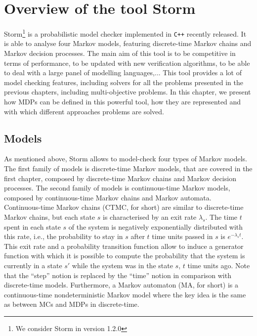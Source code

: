 \chapter{Overview of the tool Storm}\label{storm-chapter}

Storm\footnote{We consider Storm in version  1.2.0} \cite{storm1} is a probabilistic model checker implemented in \verb|C++| recently released. It is able to analyse
four Markov models, featuring discrete-time Markov chains and Markov decision processes. The main aim of this tool is to be competitive in terms of performance, to be updated with new verification algorithms, to be able to
deal with a large panel of modelling languages,... This tool provides %
a lot of model checking features, including solvers for all the problems presented in the previous chapters, including multi-objective problems.
In this chapter, we present how MDPs can be defined in this powerful tool, how they are represented and with which different approaches problems are solved.

\section{Models}
As mentioned above, Storm allows to model-check four types of Markov models.
The first family of models is discrete-time Markov models, that are covered in the first chapter, composed by
discrete-time Markov chains and Markov decision processes.
The second family of models is continuous-time Markov models, composed by continuous-time Markov chains and Markov automata. \\

Continuous-time Markov chains (CTMC, for short) \cite{maro} are similar to discrete-time Markov chains, but each state $s$ is
characterised by an exit rate $\lambda_s$.
The time $t$ spent in each state $s$ of the system is negatively exponentially distributed with this rate, i.e., the probability to stay in $s$ after $t$ time units passed in $s$ is $e^{- \lambda_s t}$.
This exit rate and a probability transition function allow to induce a generator
function with which it is possible to compute the probability
that the system is currently in a state $s'$ while the system was in the state $s$, $t$ time units ago.
Note that the ``step'' notion is replaced by the ``time'' notion in comparison with discrete-time models. Furthermore, a Markov automaton (MA, for short) is a continuous-time nondeterministic Markov model where the key idea is the same as between MCs and MDPs in discrete-time. \\

